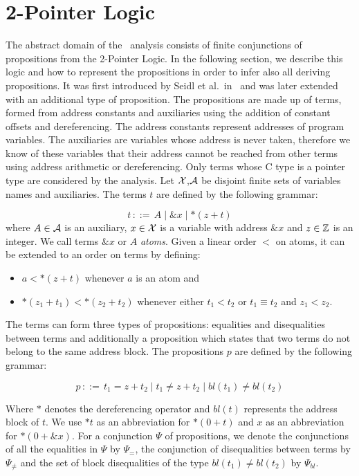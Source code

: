 \chapter{2-Pointer Logic}


The abstract domain of the \cpo\ analysis consists of finite conjunctions of propositions from the 2-Pointer Logic.
In the following section, we describe this logic and how to represent the propositions in order to
infer also all deriving propositions.
It was first introduced by Seidl et al.\ in~\cite{2pointer} and was later extended with an additional type of proposition.
The propositions are made up of terms, formed from address constants and auxiliaries using the addition of constant offsets and dereferencing.
The address constants represent addresses of program variables.
The auxiliaries are variables whose address is never taken, therefore
we know of these variables that their address cannot be reached from other terms using address arithmetic or dereferencing.
Only terms whose C type is a pointer type are considered by the analysis.
Let $\mathcal{X}$,$\mathcal{A}$ be disjoint finite sets of variables names and auxiliaries.
The terms $t$ are defined by the following grammar:

\[
    t\,{::=}\,A \mid \&x \mid *(z+t)
\]
where $A\in \mathcal{A}$ is an auxiliary, $x \in \mathcal{X}$ is a variable with address $\&x$ and $z \in \mathbb{Z}$ is an integer.
We call terms $\&x$ or $A$ \emph{atoms}.
Given a linear order $<$ on atoms, it can be extended to an order on terms by defining:
\begin{itemize}
    \item $a < *(z+t)$ whenever $a$ is an atom and
    \item $*(z_1 + t_1) < *(z_2 + t_2)$ whenever either $t_1 < t_2$ or $t_1 \equiv t_2$ and $z_1 < z_2$.
\end{itemize}

The terms can form three types of propositions: equalities and disequalities between terms and additionally a proposition which states that two terms do not belong to the same address block.
The propositions $p$ are defined by the following grammar:

\[
    p\,{::=}\,t_1=z+t_2 \mid t_1\neq z+t_2\mid bl(t_1) \neq bl(t_2)
\]

Where $*$ denotes the dereferencing operator and $bl(t)$ represents the address block of $t$.
We use $*t$ as an abbreviation for $*(0+t)$ and $x$ as an abbreviation for $*(0+\&x)$.
For a conjunction $\Psi$ of propositions, we denote the conjunctions of all the equalities in $\Psi$ by $\Psi_{=}$, the conjunction of disequalities between terms by $\Psi_{\neq}$ and the set of block disequalities of the type $bl(t_1) \neq bl(t_2)$ by $\Psi_{bl}$.

